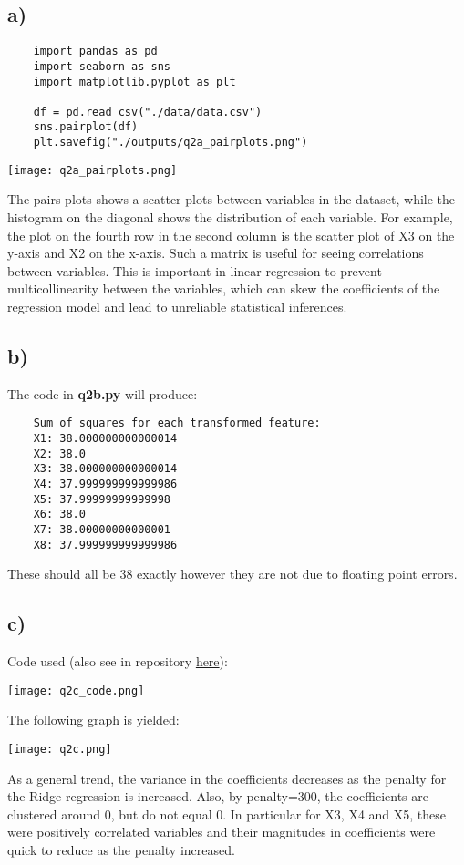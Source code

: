 \documentclass{article}
\begin{document}
\subsection*{a)}
\begin{verbatim}
	import pandas as pd
	import seaborn as sns
	import matplotlib.pyplot as plt
	
	df = pd.read_csv("./data/data.csv")
	sns.pairplot(df)
	plt.savefig("./outputs/q2a_pairplots.png")
\end{verbatim}
\texttt{[image: q2a\_pairplots.png]}

The pairs plots shows a scatter plots between variables in the dataset, while
the histogram on the diagonal shows the distribution of each variable. 
For example, the plot on the fourth row in the second column is the scatter plot of X3
on the y-axis and X2 on the x-axis. Such a matrix is useful for seeing correlations between 
variables. This is important in linear regression to prevent multicollinearity between the 
variables, which can skew the coefficients of the regression model and lead to unreliable
statistical inferences.

\newpage
\subsection*{b)}

The code in \textbf{q2b.py} will produce:

\begin{verbatim}
	Sum of squares for each transformed feature:
	X1: 38.000000000000014
	X2: 38.0
	X3: 38.000000000000014
	X4: 37.999999999999986
	X5: 37.99999999999998
	X6: 38.0
	X7: 38.00000000000001
	X8: 37.999999999999986
\end{verbatim}

These should all be 38 exactly however they are not due to floating point errors.

\subsection*{c)}

Code used (also see in repository \href{https://github.com/william-coulter/COMP9417_Homework_1/tree/master/python}{here}):

\texttt{[image: q2c\_code.png]}


\newpage
The following graph is yielded:

\texttt{[image: q2c.png]}

As a general trend, the variance in the coefficients decreases as the penalty 
for the Ridge regression is increased. Also, by penalty=300, the coefficients are 
clustered around 0, but do not equal 0. In particular for X3, X4 and X5, these were positively
correlated variables and their magnitudes in coefficients were quick to 
reduce as the penalty increased.
\end{document}
